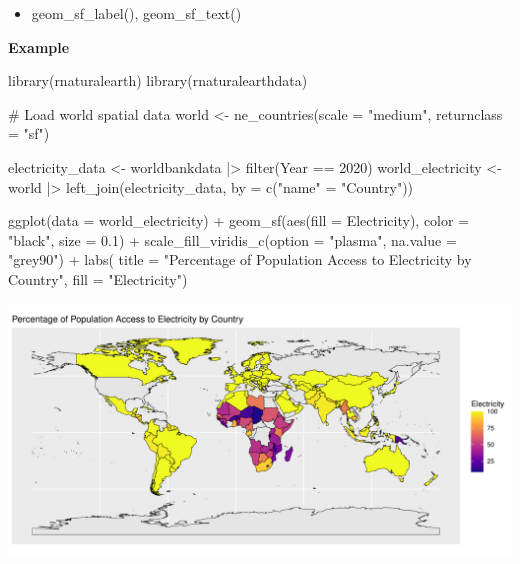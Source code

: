 \documentclass[
  letterpaper,
  DIV=11,
  numbers=noendperiod]{scrreprt}
\newenvironment{Shaded}{\begin{snugshade}}{\end{snugshade}}
\newcommand{\AttributeTok}[1]{\textcolor[rgb]{0.40,0.45,0.13}{#1}}
\newcommand{\CommentTok}[1]{\textcolor[rgb]{0.37,0.37,0.37}{#1}}
\newcommand{\DecValTok}[1]{\textcolor[rgb]{0.68,0.00,0.00}{#1}}
\newcommand{\FloatTok}[1]{\textcolor[rgb]{0.68,0.00,0.00}{#1}}
\newcommand{\FunctionTok}[1]{\textcolor[rgb]{0.28,0.35,0.67}{#1}}
\newcommand{\NormalTok}[1]{\textcolor[rgb]{0.00,0.23,0.31}{#1}}
\newcommand{\OtherTok}[1]{\textcolor[rgb]{0.00,0.23,0.31}{#1}}
\newcommand{\SpecialCharTok}[1]{\textcolor[rgb]{0.37,0.37,0.37}{#1}}
\newcommand{\StringTok}[1]{\textcolor[rgb]{0.13,0.47,0.30}{#1}}
\providecommand{\tightlist}{%
  \setlength{\itemsep}{0pt}\setlength{\parskip}{0pt}}\usepackage{longtable,booktabs,array}
\begin{document}
\begin{itemize}
\tightlist
\item
  geom\_sf\_label(), geom\_sf\_text()
\end{itemize}

\textbf{Example}

\begin{Shaded}
\begin{Highlighting}[]
\FunctionTok{library}\NormalTok{(rnaturalearth)}
\FunctionTok{library}\NormalTok{(rnaturalearthdata)}

\CommentTok{\# Load world spatial data}
\NormalTok{world }\OtherTok{\textless{}{-}} \FunctionTok{ne\_countries}\NormalTok{(}\AttributeTok{scale =} \StringTok{"medium"}\NormalTok{, }\AttributeTok{returnclass =} \StringTok{"sf"}\NormalTok{)}

\NormalTok{electricity\_data }\OtherTok{\textless{}{-}}\NormalTok{ worldbankdata }\SpecialCharTok{|\textgreater{}} \FunctionTok{filter}\NormalTok{(Year }\SpecialCharTok{==} \DecValTok{2020}\NormalTok{)}
\NormalTok{world\_electricity }\OtherTok{\textless{}{-}}\NormalTok{ world }\SpecialCharTok{|\textgreater{}} 
  \FunctionTok{left\_join}\NormalTok{(electricity\_data, }\AttributeTok{by =} \FunctionTok{c}\NormalTok{(}\StringTok{"name"} \OtherTok{=} \StringTok{"Country"}\NormalTok{))}

\FunctionTok{ggplot}\NormalTok{(}\AttributeTok{data =}\NormalTok{ world\_electricity) }\SpecialCharTok{+}
  \FunctionTok{geom\_sf}\NormalTok{(}\FunctionTok{aes}\NormalTok{(}\AttributeTok{fill =}\NormalTok{ Electricity), }\AttributeTok{color =} \StringTok{"black"}\NormalTok{, }\AttributeTok{size =} \FloatTok{0.1}\NormalTok{) }\SpecialCharTok{+}
  \FunctionTok{scale\_fill\_viridis\_c}\NormalTok{(}\AttributeTok{option =} \StringTok{"plasma"}\NormalTok{, }\AttributeTok{na.value =} \StringTok{"grey90"}\NormalTok{) }\SpecialCharTok{+}
  \FunctionTok{labs}\NormalTok{(}
    \AttributeTok{title =} \StringTok{"Percentage of Population Access to Electricity by Country"}\NormalTok{,}
    \AttributeTok{fill =} \StringTok{"Electricity"}\NormalTok{)}
\end{Highlighting}
\end{Shaded}

\includegraphics{s_files/figure-pdf/unnamed-chunk-9-1.pdf}
\end{document}
